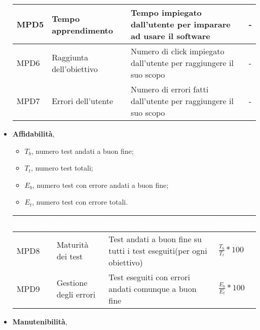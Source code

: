 \begin{itemize}
\begin{center}
\begin{tabular}{|p{1.7cm}|p{3cm}|p{4.5cm}|p{3cm}|}
                  \rowcolor[HTML]{EFEFEF}
                  MPD5 & Tempo apprendimento & Tempo impiegato dall'utente per imparare ad usare il software & -  \\ \hline
                  \rowcolor[HTML]{C0C0C0}
                  MPD6 & Raggiunta dell'obiettivo & Numero di click impiegato dall'utente per raggiungere il suo scopo & -  \\ \hline
                  \rowcolor[HTML]{EFEFEF}
                  MPD7 & Errori dell'utente & Numero di errori fatti dall'utente per raggiungere il suo scopo & -  \\ \hline
                \end{tabular}
            \end{center}
            \renewcommand\arraystretch{1}
        \item \textbf{Affidabilità},
            \begin{itemize}
                \item $T_b$, numero test andati a buon fine;
                \item $T_t$, numero test totali;
                \item $E_b$, numero test con errore andati a buon fine;
                \item $E_t$, numero test con errore totali.
            \end{itemize}
            \renewcommand\arraystretch{1,5}
            \begin{center}
                \begin{tabular}{|p{1.7cm}|p{3cm}|p{4.5cm}|p{3cm}|} \hline
                  \rowcolor[HTML]{036400}
                  \textcolor[HTML]{FFFFFF}{\textbf{Metrica}} & \textcolor[HTML]{FFFFFF}{\textbf{Nome}} & \textcolor[HTML]{FFFFFF}{\textbf{Descrizione}} & \textcolor[HTML]{FFFFFF}{\textbf{Formula}}    \\ \hline
                  \rowcolor[HTML]{EFEFEF}
                  MPD8 & Maturità dei test & Test andati a buon fine su tutti i test eseguiti(per ogni obiettivo) & $\frac{T_b}{T_t}*100$  \\ \hline
                  \rowcolor[HTML]{C0C0C0}
                  MPD9 & Gestione degli errori & Test eseguiti con errori andati comunque a buon fine & $\frac{E_b}{E_t}*100$  \\ \hline
                \end{tabular}
            \end{center}
            \renewcommand\arraystretch{1}
        \item \textbf{Manutenibilità},

\end{itemize}
